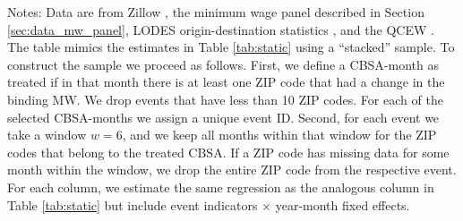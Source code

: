\begin{table}[hbt!]
    \begin{minipage}{.95\textwidth} \footnotesize
        \vspace{2mm}
        Notes: 
        Data are from Zillow \parencite{ZillowData}, 
        the minimum wage panel described in Section \ref{sec:data_mw_panel}, 
        LODES origin-destination statistics \parencite{CensusLODES},
        and the QCEW \parencite{QCEW}.
        The table mimics the estimates in Table \ref{tab:static} using a 
        ``stacked'' sample.
        To construct the sample we proceed as follows.
        First, we define a CBSA-month as treated if in that month there is at 
        least one ZIP code that had a change in the binding MW.
        We drop events that have less than 10 ZIP codes.
        For each of the selected CBSA-months we assign a unique event ID. 
        Second, for each event we take a window $w = 6$, and we keep all months 
        within that window for the ZIP codes that belong to the treated CBSA.
        If a ZIP code has missing data for some month within the window, we drop 
        the entire ZIP code from the respective event.
        For each column, we estimate the same regression as the analogous column 
        in Table \ref{tab:static} but include event indicators $\times$ year-month
        fixed effects.
    \end{minipage}
\end{table}
